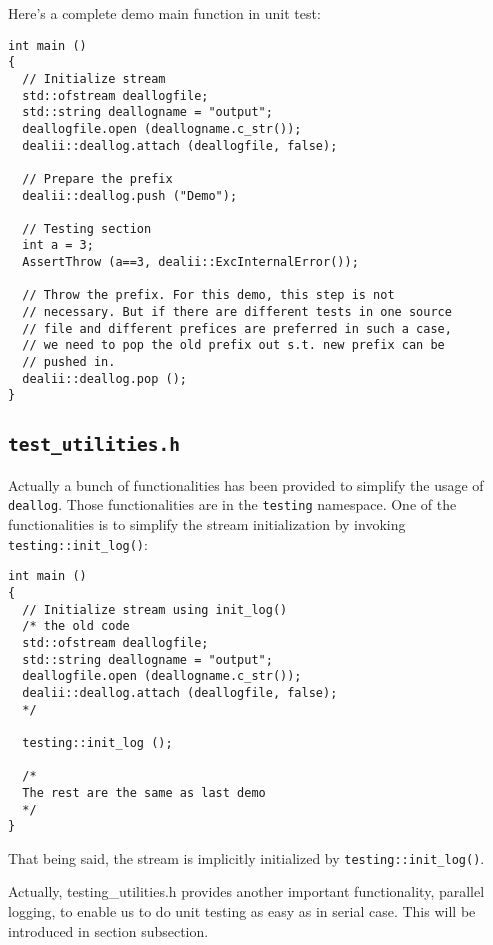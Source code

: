 \documentclass[openany]{book}
\begin{document}
Here's a complete demo main function in unit test:
\begin{lstlisting}
int main ()
{
  // Initialize stream
  std::ofstream deallogfile;
  std::string deallogname = "output";
  deallogfile.open (deallogname.c_str());
  dealii::deallog.attach (deallogfile, false);
  
  // Prepare the prefix
  dealii::deallog.push ("Demo");
  
  // Testing section
  int a = 3;
  AssertThrow (a==3, dealii::ExcInternalError());
  
  // Throw the prefix. For this demo, this step is not 
  // necessary. But if there are different tests in one source 
  // file and different prefices are preferred in such a case, 
  // we need to pop the old prefix out s.t. new prefix can be 
  // pushed in.
  dealii::deallog.pop ();
}
\end{lstlisting}

\subsection{{\tt test\_utilities.h}}
Actually a bunch of functionalities has been provided to simplify the usage of {\tt deallog}. Those functionalities are in the {\tt testing} namespace. One of the functionalities is to simplify the stream initialization by invoking {\tt testing::init\_log()}:
\begin{lstlisting}
int main ()
{
  // Initialize stream using init_log()
  /* the old code
  std::ofstream deallogfile;
  std::string deallogname = "output";
  deallogfile.open (deallogname.c_str());
  dealii::deallog.attach (deallogfile, false);
  */
  
  testing::init_log ();
  
  /*
  The rest are the same as last demo
  */
}
\end{lstlisting} 
That being said, the stream is implicitly initialized by {\tt testing::init\_log()}.

Actually, testing\_utilities.h provides another important functionality, parallel logging, to enable us to do unit testing as easy as in serial case. This will be introduced in section subsection.
\end{document}
